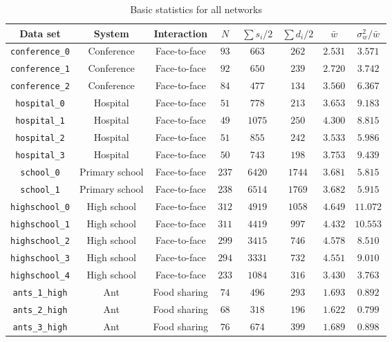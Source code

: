 \documentclass[twocolumn,8pt]{article}
\begin{document}
\begin{table}[p] 
 \centering 
\small
 \caption{Basic statistics for all networks} 
  \label{basic_table} 
\begin{tabular}{c|ccccccc} 
Data set & System & Interaction & $N$ & $\sum s_{i}/2$ & $\sum d_{i}/2$ & $\bar{w}$ & $\sigma_{w}^{2}/\bar{w}$ \\ 
\midrule 
\verb|conference_0| & Conference & Face-to-face & $93$ & $663$ & $262$ & $2.531$ & $3.571$\\
\verb|conference_1| & Conference & Face-to-face & $92$ & $650$ & $239$ & $2.720$ & $3.742$\\
\verb|conference_2| & Conference & Face-to-face & $84$ & $477$ & $134$ & $3.560$ & $6.367$\\
\verb|hospital_0| & Hospital & Face-to-face & $51$ & $778$ & $213$ & $3.653$ & $9.183$\\
\verb|hospital_1| & Hospital & Face-to-face & $49$ & $1075$ & $250$ & $4.300$ & $8.815$\\
\verb|hospital_2| & Hospital & Face-to-face & $51$ & $855$ & $242$ & $3.533$ & $5.986$\\
\verb|hospital_3| & Hospital & Face-to-face & $50$ & $743$ & $198$ & $3.753$ & $9.439$\\
\verb|school_0| & Primary school & Face-to-face & $237$ & $6420$ & $1744$ & $3.681$ & $5.815$\\
\verb|school_1| & Primary school & Face-to-face & $238$ & $6514$ & $1769$ & $3.682$ & $5.915$\\
\verb|highschool_0| & High school & Face-to-face & $312$ & $4919$ & $1058$ & $4.649$ & $11.072$\\
\verb|highschool_1| & High school & Face-to-face & $311$ & $4419$ & $997$ & $4.432$ & $10.553$\\
\verb|highschool_2| & High school & Face-to-face & $299$ & $3415$ & $746$ & $4.578$ & $8.510$\\
\verb|highschool_3| & High school & Face-to-face & $294$ & $3331$ & $732$ & $4.551$ & $9.010$\\
\verb|highschool_4| & High school & Face-to-face & $233$ & $1084$ & $316$ & $3.430$ & $3.763$\\
\verb|ants_1_high| & Ant & Food sharing & $74$ & $496$ & $293$ & $1.693$ & $0.892$\\
\verb|ants_2_high| & Ant & Food sharing & $68$ & $318$ & $196$ & $1.622$ & $0.799$\\
\verb|ants_3_high| & Ant & Food sharing & $76$ & $674$ & $399$ & $1.689$ & $0.898$\\

\end{tabular}
\end{table}
\end{document}
